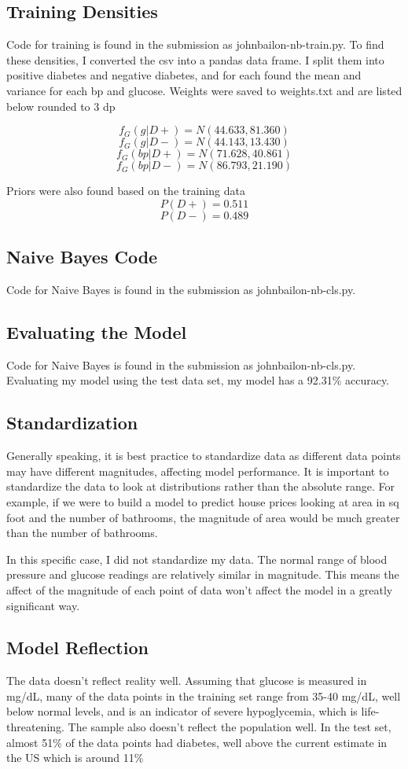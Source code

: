 \documentclass{article}
\begin{document}
\subsection{Training Densities}
Code for training is found in the submission as johnbailon-nb-train.py. To find these densities, I converted the csv into a pandas data frame. I split them into positive diabetes and negative diabetes, and for each found the mean and variance for each bp and glucose.
Weights were saved to weights.txt and are listed below rounded to 3 dp

\[f_G(g | D+) = N(44.633, 81.360)\]
\[f_G(g | D-) = N(44.143, 13.430)\]
\[f_G(bp | D+) = N(71.628, 40.861) \]
\[f_G(bp | D-) = N(86.793, 21.190)\]

Priors were also found based on the training data
\[P(D+) = 0.511\]
\[P(D-) = 0.489\]

\subsection{Naive Bayes Code}
Code for Naive Bayes is found in the submission as johnbailon-nb-cls.py. 

\subsection{Evaluating the Model}
Code for Naive Bayes is found in the submission as johnbailon-nb-cls.py. Evaluating my model using the test data set, my model has a 92.31\% accuracy.

\subsection{Standardization}
 Generally speaking, it is best practice to standardize data as different data points may have different magnitudes, affecting model performance. It is important to standardize the data to look at distributions rather than the absolute range. For example, if we were to build a model to predict house prices looking at area in sq foot and the number of bathrooms, the magnitude of area would be much greater than the number of bathrooms. 

 In this specific case, I did not standardize my data. The normal range of blood pressure and glucose readings are relatively similar in magnitude. This means the affect of the magnitude of each point of data won't affect the model in a greatly significant way.
 

\subsection{Model Reflection}
The data doesn't reflect reality well. Assuming that glucose is measured in mg/dL, many of the data points in the training set range from 35-40 mg/dL, well below normal levels, and is an indicator of severe hypoglycemia, which is life-threatening. The sample also doesn't reflect the population well. In the test set, almost 51\% of the data points had diabetes, well above the current estimate in the US which is around 11\%  
\end{document}
